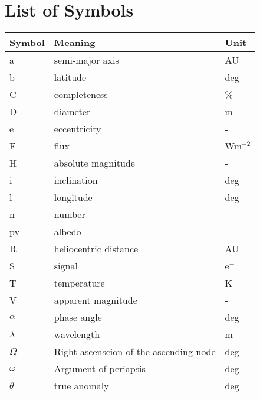 \listoffigures
\listoftables

\chapter*{List of Symbols}

\begin{table}[h]
\centering
\begin{tabular}{l|l|l}
\textbf{Symbol} & \textbf{Meaning}                       & \textbf{Unit} \\ \hline
a               & semi-major axis                        & AU            \\
b               & latitude                               & deg           \\
C               & completeness                           & \%            \\
D               & diameter                               & m             \\
e               & eccentricity                           & -             \\
F               & flux                                   & Wm$^{-2}$          \\
H               & absolute magnitude                     & -             \\
i               & inclination                            & deg           \\
l               & longitude                              & deg           \\
n               & number                                 & -             \\
pv              & albedo                                 & -             \\
R               & heliocentric distance                  & AU            \\
S               & signal                                 & e$^-$            \\
T               & temperature                            & K             \\
V               & apparent magnitude                     & -             \\
$\alpha$           & phase angle                            & deg           \\
$\lambda$          & wavelength                             & m             \\
$\Omega$           & Right ascenscion of the ascending node & deg           \\
$\omega$           & Argument of periapsis                  & deg           \\
$\theta$           & true anomaly                           & deg          
\end{tabular}
\end{table}

